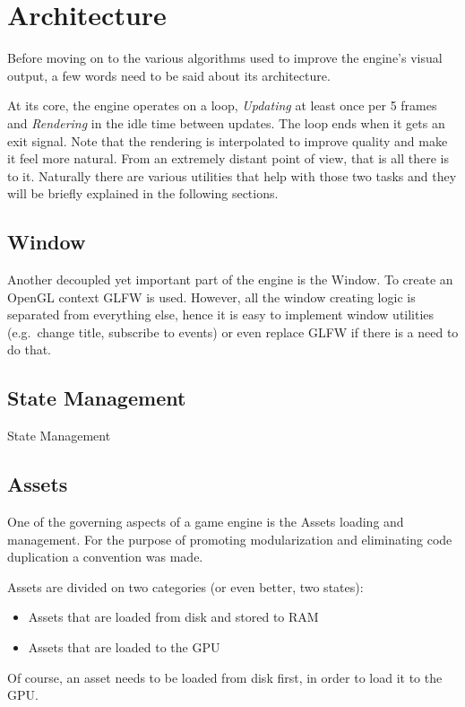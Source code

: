 \section{Architecture}
Before moving on to the various algorithms used to improve the engine's visual output, a few
words need to be said about its architecture.

At its core, the engine operates on a loop, \textit{Updating} at least once per 5 frames 
and \textit{Rendering} in the idle time between updates. The loop ends when it gets an exit
signal. Note that the rendering is interpolated to improve quality and make it feel more natural.
From an extremely distant point of view, that is all there is to it. Naturally there are various
utilities that help with those two tasks and they will be briefly explained in the following
sections.

\subsection{Window}
Another decoupled yet important part of the engine is the Window. To create an OpenGL context
GLFW is used. However, all the window creating logic is separated from everything else, hence it
is easy to implement window utilities (e.g.\ change title, subscribe to events) or even replace
GLFW if there is a need to do that.

\subsection{State Management}
State Management

\subsection{Assets}
One of the governing aspects of a game engine is the Assets loading and management. For the
purpose of promoting modularization and eliminating code duplication a convention was made.

\noindent Assets are divided on two categories (or even better, two states):

\begin{itemize}
\item Assets that are loaded from disk and stored to RAM
\item Assets that are loaded to the GPU
\end{itemize}

\noindent Of course, an asset needs to be loaded from disk first, in order to load it to the GPU\@.


